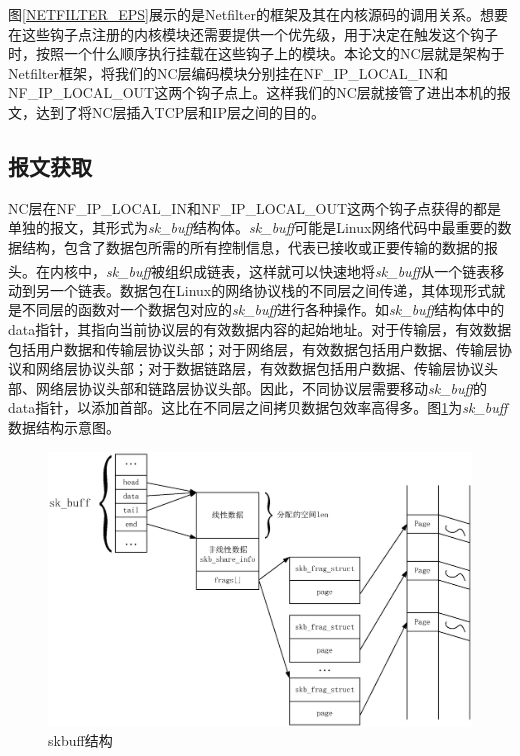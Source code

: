 \par
图\ref{NETFILTER_EPS}展示的是Netfilter的框架及其在内核源码的调用关系。想要在这些钩子点注册的内核模块还需要提供一个优先级，用于决定在触发这个钩子时，按照一个什么顺序执行挂载在这些钩子上的模块。本论文的NC层就是架构于Netfilter框架，将我们的NC层编码模块分别挂在NF\_IP\_LOCAL\_IN和NF\_IP\_LOCAL\_OUT这两个钩子点上。这样我们的NC层就接管了进出本机的报文，达到了将NC层插入TCP层和IP层之间的目的。
\subsection{报文获取}
NC层在NF\_IP\_LOCAL\_IN和NF\_IP\_LOCAL\_OUT这两个钩子点获得的都是单独的报文，其形式为\emph{sk\_buff}结构体。\emph{sk\_buff}可能是Linux网络代码中最重要的数据结构，包含了数据包所需的所有控制信息，代表已接收或正要传输的数据的报头\textsuperscript{\cite{linux网络技术内幕}}。在内核中，\emph{sk\_buff}被组织成链表，这样就可以快速地将\emph{sk\_buff}从一个链表移动到另一个链表。数据包在Linux的网络协议栈的不同层之间传递，其体现形式就是不同层的函数对一个数据包对应的\emph{sk\_buff}进行各种操作。如\emph{sk\_buff}结构体中的data指针，其指向当前协议层的有效数据内容的起始地址。对于传输层，有效数据包括用户数据和传输层协议头部；对于网络层，有效数据包括用户数据、传输层协议和网络层协议头部；对于数据链路层，有效数据包括用户数据、传输层协议头部、网络层协议头部和链路层协议头部。因此，不同协议层需要移动\emph{sk\_buff}的data指针，以添加首部。这比在不同层之间拷贝数据包效率高得多。图\ref{SKBUFFEPS}为\emph{sk\_buff}数据结构示意图。
\begin{figure}[htbp]
	\centering
	\includegraphics[width=6in]{figures/skbuff.eps}
	\caption{skbuff结构}
	\label{SKBUFFEPS}
\end{figure}

